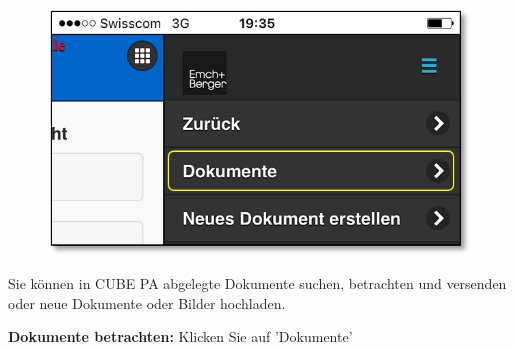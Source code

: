 \begin{figure}   %
  \vspace{-35pt}      %
  \begin{center}
    \includegraphics[width=1\linewidth]{../chapters/11_Dokumentenablage/pictures/11-mob02_Dokumente_anschauen.jpg}
  \end{center}
  \vspace{-20pt}
  \vspace{-10pt}
\end{figure}

Sie können in CUBE PA abgelegte Dokumente suchen, betrachten und versenden oder neue Dokumente oder Bilder hochladen.

\vspace{\baselineskip}

\textbf{Dokumente betrachten:} Klicken Sie auf 'Dokumente'

